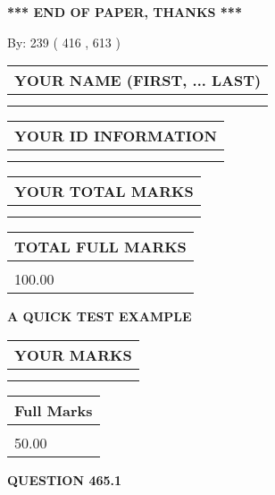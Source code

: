 \documentclass[12pt]{article}
\begin{document}
\vspace{1.0in} 
{\textbf{\large{ *** END OF PAPER, THANKS *** }}} 
   
   
\hspace{1.0in} By: 
 239 ( 416 ,  613 )
   
   
   
   
\newpage 
\setcounter{page}{ 
   465001 } 
   
   
   
   
\noindent\begin{tabular}{|l|}
\hline
YOUR NAME (FIRST, ... LAST)  \\
\hline
 \\ 
 \\ 
\hline
\end{tabular}
\hspace{0.05in} \begin{tabular}{|l|}
\hline
 YOUR   ID   INFORMATION  \\
\hline
 \\ 
 \\ 
\hline
\end{tabular}
   
   
\vspace{0.2in}\noindent\begin{tabular}{|l|}
\hline
YOUR TOTAL MARKS  \\
\hline
 \\ 
 \\ 
\hline
\end{tabular}
\hspace{0.05in} \begin{tabular}{|l|}
\hline
TOTAL FULL MARKS  \\
\hline
 \\ 
100.00 \\
\hline
\end{tabular}
   
   
 \vspace{0.2in}
{\LARGE {\textbf{ A QUICK TEST EXAMPLE}}}
   
   
  
\vspace{0.2in}
  
\noindent\begin{tabular}{|l|}
\hline
 YOUR MARKS  \\
\hline
 \\ 
 \\ 
\hline
\end{tabular}
\hspace{0.05in} \begin{tabular}{|l|}
\hline
 Full Marks  \\
\hline
 \\ 
50.00 \\
\hline
\end{tabular}
{\textbf{\Large{QUESTION
465.1 
}}}
  
\end{document}
